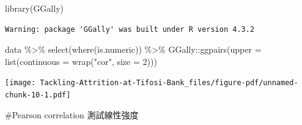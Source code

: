 \documentclass[
  letterpaper,
  DIV=11,
  numbers=noendperiod]{scrartcl}
\newenvironment{Shaded}{\begin{snugshade}}{\end{snugshade}}
\newcommand{\AttributeTok}[1]{\textcolor[rgb]{0.40,0.45,0.13}{#1}}
\newcommand{\CommentTok}[1]{\textcolor[rgb]{0.37,0.37,0.37}{#1}}
\newcommand{\DecValTok}[1]{\textcolor[rgb]{0.68,0.00,0.00}{#1}}
\newcommand{\FunctionTok}[1]{\textcolor[rgb]{0.28,0.35,0.67}{#1}}
\newcommand{\NormalTok}[1]{\textcolor[rgb]{0.00,0.23,0.31}{#1}}
\newcommand{\SpecialCharTok}[1]{\textcolor[rgb]{0.37,0.37,0.37}{#1}}
\newcommand{\StringTok}[1]{\textcolor[rgb]{0.13,0.47,0.30}{#1}}
\begin{document}
\begin{Shaded}
\begin{Highlighting}[]
\FunctionTok{library}\NormalTok{(GGally)}
\end{Highlighting}
\end{Shaded}

\begin{verbatim}
Warning: package 'GGally' was built under R version 4.3.2
\end{verbatim}

\begin{Shaded}
\begin{Highlighting}[]
\NormalTok{data }\SpecialCharTok{\%\textgreater{}\%} 
   \FunctionTok{select}\NormalTok{(}\FunctionTok{where}\NormalTok{(is.numeric)) }\SpecialCharTok{\%\textgreater{}\%} 
\NormalTok{  GGally}\SpecialCharTok{::}\FunctionTok{ggpairs}\NormalTok{(}\AttributeTok{upper =} \FunctionTok{list}\NormalTok{(}\AttributeTok{continuous =} \FunctionTok{wrap}\NormalTok{(}\StringTok{"cor"}\NormalTok{, }\AttributeTok{size =} \DecValTok{2}\NormalTok{)))}
\end{Highlighting}
\end{Shaded}

\texttt{[image: Tackling-Attrition-at-Tifosi-Bank\_files/figure-pdf/unnamed-chunk-10-1.pdf]}

\begin{Shaded}
\begin{Highlighting}[]
\CommentTok{\#Pearson correlation 測試線性強度}
\end{Highlighting}
\end{Shaded}
\end{document}
